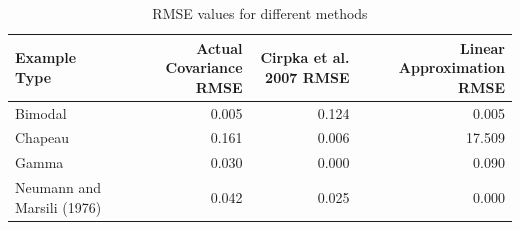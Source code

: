 \begin{table}[ht]
\captionsetup{justification=justified,singlelinecheck=false}
\centering
\caption{RMSE values for different methods}
\label{tab:rmse_methods}
\begin{tabular}{lrrr}
\toprule
              Example Type &  Actual Covariance RMSE &  Cirpka et al. 2007 RMSE &  Linear Approximation RMSE \\
\midrule
                   Bimodal &                   0.005 &                    0.124 &                      0.005 \\
                   Chapeau &                   0.161 &                    0.006 &                     17.509 \\
                     Gamma &                   0.030 &                    0.000 &                      0.090 \\
Neumann and Marsili (1976) &                   0.042 &                    0.025 &                      0.000 \\
\bottomrule
\end{tabular}
\end{table}
